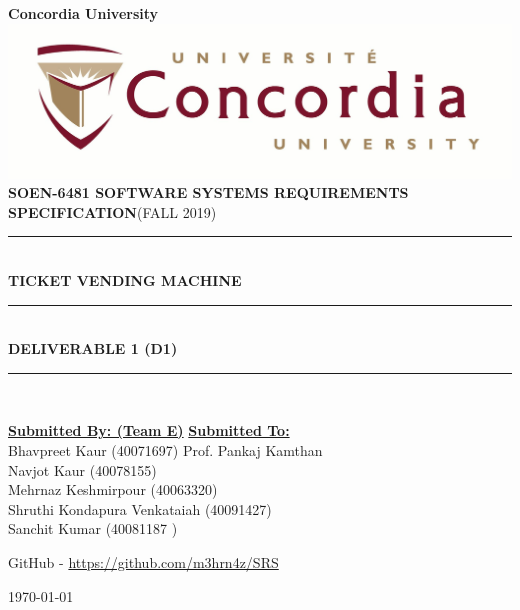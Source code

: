 \documentclass[a4paper,12pt]{report}
\newcommand{\TermName}{FALL 2019}
\newcommand{\Course}{\textbf{SOEN-6481 \vspace{0.5cm} SOFTWARE SYSTEMS REQUIREMENTS SPECIFICATION}}
\begin{document}

\begin{titlepage}
\newcommand{\HRule}{\rule{\linewidth}{0.5mm}} %


\centering
\textbf{\LARGE  Concordia University} \\ [5mm] 
\includegraphics[scale=.1]{University_logo.jpg}\\[1cm] 
\textsc{\Large \Course (\TermName)} \\  [0.5cm]

	
\HRule \\[0.4cm]
{ \huge \bfseries TICKET VENDING MACHINE}\\[0.4cm] 
\HRule \\[0.5cm]

{\large \textbf{DELIVERABLE 1 (D1)} }	

\HRule \\[1.5cm]
\vspace{3cm}

\begin{flushleft}


\textbf{\underline{\Large Submitted By: (Team E)}}
\hfill
\textbf{\underline{\Large Submitted To:}} \\
\vspace{3mm}
\large Bhavpreet Kaur (40071697)
\hfill
\large Prof. Pankaj Kamthan \\

\large Navjot Kaur (40078155) \hfill \\
\large Mehrnaz Keshmirpour (40063320) \hfill \\
\large Shruthi Kondapura Venkataiah (40091427) \hfill \\
\large Sanchit Kumar (40081187	) \\

\end{flushleft}

\centering \vspace{1cm}

GitHub - \href{https://github.com/m3hrn4z/SRS}{https://github.com/m3hrn4z/SRS}

\vspace{0.1cm}
{\large \today}\\[2cm]

\vfill
\end{titlepage}
\end{document}
